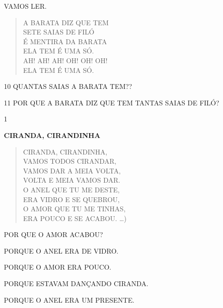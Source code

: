VAMOS LER.

\begin{verse}
A BARATA DIZ QUE TEM\\
SETE SAIAS DE FILÓ\\
É MENTIRA DA BARATA\\
ELA TEM É UMA SÓ.\\
AH! AH! AH! OH! OH! OH!\\
ELA TEM É UMA SÓ.
\end{verse}


\num{10} QUANTAS SAIAS A BARATA TEM??


\num{11} POR QUE A BARATA DIZ QUE TEM TANTAS SAIAS DE FILÓ?




\num{1}

\textbf{CIRANDA, CIRANDINHA}

\begin{verse}
CIRANDA, CIRANDINHA,\\
VAMOS TODOS CIRANDAR,\\
VAMOS DAR A MEIA VOLTA,\\
VOLTA E MEIA VAMOS DAR.\\
O ANEL QUE TU ME DESTE,\\
ERA VIDRO E SE QUEBROU,\\
O AMOR QUE TU ME TINHAS,\\
ERA POUCO E SE ACABOU. \ldots{})
\end{verse}


POR QUE O AMOR ACABOU?

\begin{escolha}
\item PORQUE O ANEL ERA DE VIDRO.

\item PORQUE O AMOR ERA POUCO.

\item PORQUE ESTAVAM DANÇANDO CIRANDA.

\item PORQUE O ANEL ERA UM PRESENTE.
\end{escolha}

